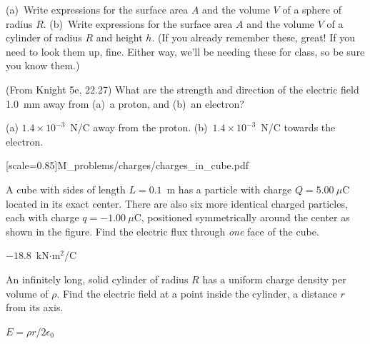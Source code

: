 \begin{Exercise}
(a)~Write expressions for the surface area $A$ and the volume $V$ of a sphere of radius $R$. 
(b)~Write expressions for the surface area $A$ and the volume $V$ of a cylinder of radius $R$ and height $h$.  (If you already remember these, great!  If you need to look them up, fine.  Either way, we'll be needing these for class, so be sure you know them.)
\end{Exercise}



\begin{Exercise}
(From Knight 5e, 22.27) What are the strength and direction of the electric field 1.0~mm away from (a)~a proton, and (b)~an electron?
\end{Exercise}
\begin{Answer}
(a) $1.4 \times 10^{-3}$~N/C away from the proton. (b)~$1.4 \times 10^{-3}$~N/C towards the electron.
\end{Answer}

[scale=0.85]{M_problems/charges/charges_in_cube.pdf}{
\begin{Exercise}
A cube with sides of length $L=0.1$~m has a particle with charge $Q=5.00~\mu$C located in its exact center.  
There are also six more identical charged particles, each with charge $q=-1.00~\mu$C, positioned symmetrically around the center as shown in the figure.  
Find the electric flux through \textit{one} face of the cube.
\end{Exercise}
\begin{Answer}
$-18.8$~kN$\cdot$m$^2$/C
\end{Answer}

\begin{Exercise}
An infinitely long, solid cylinder of radius $R$ has a uniform charge density per volume of $\rho$.  
Find the electric field at a point inside the cylinder, a distance $r$ from its axis. 
\end{Exercise}
\begin{Answer}
$E = \rho r / 2 \epsilon_0$
\end{Answer}
}

